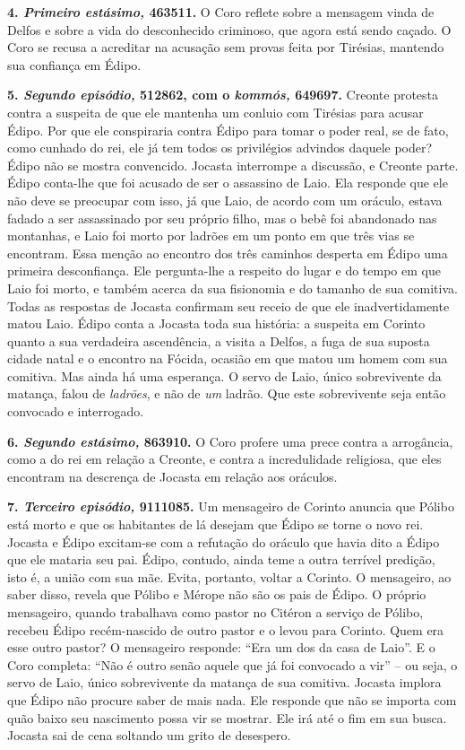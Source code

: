 \textbf{4. \emph{Primeiro estásimo,} 463511.} O Coro reflete sobre a
mensagem vinda de Delfos e sobre a vida do desconhecido criminoso, que
agora está sendo caçado. O Coro se recusa a acreditar na acusação sem
provas feita por Tirésias, mantendo sua confiança em Édipo.

\textbf{5. \emph{Segundo episódio,} 512862, com o \emph{kommós,} 649697.} 
Creonte protesta contra a suspeita de que ele mantenha um
conluio com Tirésias para acusar Édipo. Por que ele conspiraria contra
Édipo para tomar o poder real, se de fato, como cunhado do rei, ele já
tem todos os privilégios advindos daquele poder? Édipo não se mostra
convencido. Jocasta interrompe a discussão, e Creonte parte. Édipo
conta-lhe que foi acusado de ser o assassino de Laio. Ela responde que
ele não deve se preocupar com isso, já que Laio, de acordo com um
oráculo, estava fadado a ser assassinado por seu próprio filho, mas o
bebê foi abandonado nas montanhas, e Laio foi morto por ladrões em um
ponto em que três vias se encontram. Essa menção ao encontro dos três
caminhos desperta em Édipo uma primeira desconfiança. Ele pergunta-lhe a
respeito do lugar e do tempo em que Laio foi morto, e também acerca da
sua fisionomia e do tamanho de sua comitiva. Todas as respostas de
Jocasta confirmam seu receio de que ele inadvertidamente matou Laio.
Édipo conta a Jocasta toda sua história: a suspeita em Corinto quanto a
sua verdadeira ascendência, a visita a Delfos, a fuga de sua suposta
cidade natal e o encontro na Fócida, ocasião em que matou um homem com
sua comitiva. Mas ainda há uma esperança. O servo de Laio, único
sobrevivente da matança, falou de \emph{ladrões}, e não de \emph{um}
ladrão. Que este sobrevivente seja então convocado e interrogado.

\textbf{6. \emph{Segundo estásimo,} 863910.} O Coro profere uma prece
contra a arrogância, como a do rei em relação a Creonte, e contra a
incredulidade religiosa, que eles encontram na descrença de Jocasta em
relação aos oráculos.

\textbf{7. \emph{Terceiro episódio,} 9111085.} Um mensageiro de
Corinto anuncia que Pólibo está morto e que os habitantes de lá desejam
que Édipo se torne o novo rei. Jocasta e Édipo excitam-se com a
refutação do oráculo que havia dito a Édipo que ele mataria seu pai.
Édipo, contudo, ainda teme a outra terrível predição, isto é, a união
com sua mãe. Evita, portanto, voltar a Corinto. O mensageiro, ao saber
disso, revela que Pólibo e Mérope não são os pais de Édipo. O próprio
mensageiro, quando trabalhava como pastor no Citéron a serviço de
Pólibo, recebeu Édipo recém-nascido de outro pastor e o levou para
Corinto. Quem era esse outro pastor? O mensageiro responde: ``Era um dos
da casa de Laio''. E o Coro completa: ``Não é outro senão aquele que já
foi convocado a vir'' -- ou seja, o servo de Laio, único sobrevivente da
matança de sua comitiva. Jocasta implora que Édipo não procure saber de
mais nada. Ele responde que não se importa com quão baixo seu nascimento
possa vir se mostrar. Ele irá até o fim em sua busca. Jocasta sai de
cena soltando um grito de desespero.

